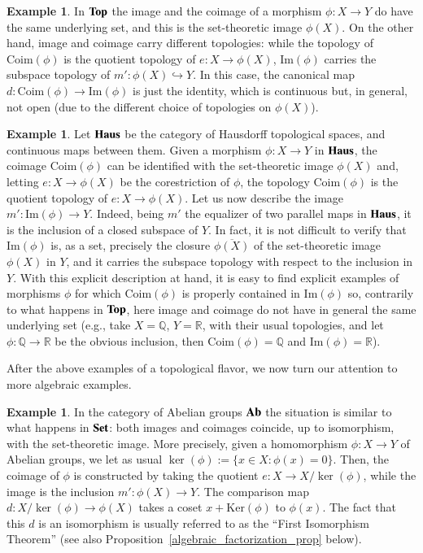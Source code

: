 \documentclass[12pt]{article}
\theoremstyle{definition}
\newtheorem{example}[lemma]{Example}
\def\R{\mathbb R}
\def\Q{\mathbb Q}
\def\Coim{\mathrm{Coim}}
\def\Ker{\mathrm{Ker}}
\def\Im{\mathrm{Im}}
\newcommand{\Set}{\textbf{\textup{Set}}}
\newcommand{\Ab}{\textbf{\textup{Ab}}}
\renewcommand{\Top}{\textbf{\textup{Top}}}
\newcommand{\Haus}{\textbf{\textup{Haus}}}
\numberwithin{equation}{section}
\begin{document}
\begin{example}
In $\Top$ the image and the coimage of a morphism $\phi\colon X \to Y$ do have the same underlying set, and this is the set-theoretic image $\phi(X)$. On the other hand, image and coimage carry different topologies: while the topology of $\Coim(\phi)$ is the quotient topology of $e\colon X \to \phi(X)$, $\Im(\phi)$ carries the subspace topology of $m' \colon \phi(X) \hookrightarrow Y$. In this case, the canonical map $d\colon \Coim(\phi)\to \Im(\phi)$ is just the identity, which is continuous but, in general, not open (due to the different choice of topologies on $\phi(X)$).
\end{example}

\begin{example}
Let $\Haus$ be the category of Hausdorff topological spaces, and continuous maps between them. Given a morphism $\phi\colon X\to Y$ in $\Haus$, the coimage $\Coim(\phi)$ can be identified with the set-theoretic image $\phi(X)$ and, letting $e\colon X \to \phi(X)$ be the corestriction of $\phi$, the topology $\Coim(\phi)$ is the quotient topology of $e\colon X \to \phi(X)$. 
Let us now describe the image $m'\colon \Im(\phi)\to Y$. Indeed, being $m'$ the equalizer of two parallel maps in $\Haus$, it is the inclusion of a closed subspace of $Y$. In fact, it is not difficult to verify that $\Im(\phi)$ is, as a set, precisely the closure $\overline{\phi(X)}$ of the set-theoretic image $\phi(X)$ in $Y$, and it carries the subspace topology with respect to the inclusion in $Y$. With this explicit description at hand, it is easy to find explicit examples of morphisms $\phi$ for which $\Coim(\phi)$ is properly contained in $\Im(\phi)$ so, contrarily to what happens in $\Top$, here image and coimage do not have in general the same underlying set (e.g., take $X=\Q$, $Y=\R$, with their usual topologies, and let $\phi\colon \Q\to \R$ be the obvious inclusion, then $\Coim(\phi)=\Q$ and $\Im(\phi)=\R$).
\end{example}

After the above examples of a topological flavor, we now turn our attention to more algebraic examples.

\begin{example}
In the category of Abelian groups $\Ab$ the situation is similar to what happens in $\Set$: both images and coimages coincide, up to isomorphism, with the set-theoretic image. More precisely, given a homomorphism $\phi\colon X\to Y$ of Abelian groups, we let as usual $\ker(\phi):=\{x\in X:\phi(x)=0\}$. Then, the coimage of $\phi$ is constructed by taking the quotient $e\colon X\to X/\ker(\phi)$, while the image is the inclusion $m'\colon\phi(X)\to Y$. The comparison map $d\colon X/\ker(\phi)\to \phi(X)$ takes a coset $x+\Ker(\phi)$ to $\phi(x)$. The fact that this $d$ is an isomorphism is usually referred to as the ``First Isomorphism Theorem'' (see also Proposition~\ref{algebraic_factorization_prop} below).
\end{example}
\end{document}
